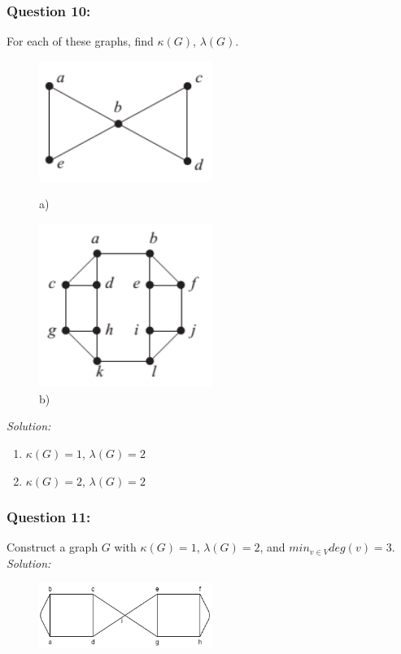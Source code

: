 \documentclass[a4paper]{article}
\begin{document}
	\subsubsection*{Question 10:}
	For each of these graphs, find $\kappa(G)$, $\lambda(G)$.
	\begin{figure}[H]
		\begin{minipage}{0.5\textwidth}
			\centering
			\includegraphics[width=0.5\textwidth]{tut910_1.png}
			\caption*{a)}
		\end{minipage}
		\begin{minipage}{0.5\textwidth}
			\centering
			\includegraphics[width=0.5\textwidth]{tut910_2.png}
			\caption*{b)}
		\end{minipage}
	\end{figure}
	\emph{Solution:}
	\begin{enumerate}[label = \alph*)]
		\item $\kappa(G) = 1$, $\lambda(G) = 2$
		\item $\kappa(G) = 2$, $\lambda(G) = 2$
	\end{enumerate}
	\subsubsection*{Question 11:}
	Construct a graph $G$ with $\kappa(G)=1$, $\lambda(G)=2$, and $min_{v \in V} deg(v) = 3$.\\
	\emph{Solution:}
	\begin{figure}[H]
		\centering
		\includegraphics[width=0.5\textwidth]{tut910_3.png}
	\end{figure}
\end{document}
